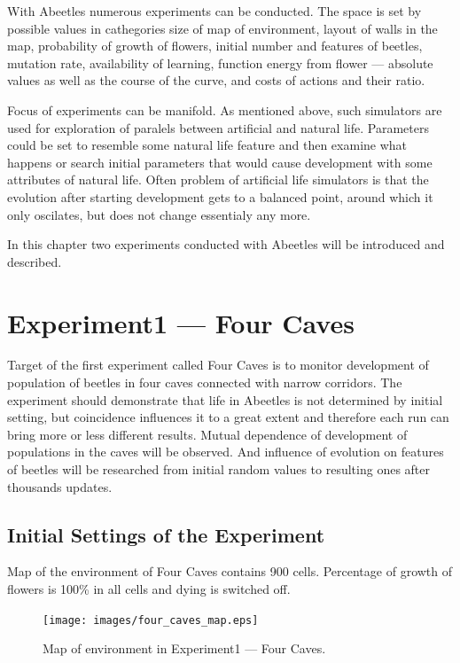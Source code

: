 \documentclass[a4paper,12pt]{report}
\begin{document}
With Abeetles numerous experiments can be conducted. The space is set by possible values in cathegories size of map of environment, layout of walls in the map, probability of growth of flowers, initial	number and features of beetles,	mutation rate, availability of learning, function energy from flower --- absolute values	as well as the course of the curve, and costs of actions and their ratio.

Focus of experiments can be manifold. As mentioned above, such simulators are used for exploration of paralels between artificial and natural life. Parameters could be set to resemble some natural life feature and then examine what happens or search initial parameters that would cause development with some attributes of natural life. Often problem of artificial life simulators is that the evolution after starting development gets to a balanced point, around which it only oscilates, but does not change essentialy any more. %

In this chapter two experiments conducted with Abeetles will be introduced and described.

\section{Experiment1 --- Four Caves}

Target of the first experiment called Four Caves is to monitor development of population of beetles in four caves connected with narrow corridors. The experiment should demonstrate that life in Abeetles is not determined by initial setting, but coincidence influences it to a great extent and therefore each run can bring more or less different results. Mutual dependence of development of populations in the caves will be observed. And influence of evolution on features of beetles will be researched from initial random values to resulting ones after thousands updates. 

\subsection{Initial Settings of the Experiment}
Map of the environment of Four Caves contains 900 cells. Percentage of growth of flowers is 100\% in all cells and dying is switched off. 

\begin{figure}
\begin{center}
  \texttt{[image: images/four\_caves\_map.eps]}
  \caption{Map of environment in Experiment1 --- Four Caves.}
  \label{img.four_caves_map}
\end{center}
\end{figure}
\end{document}
